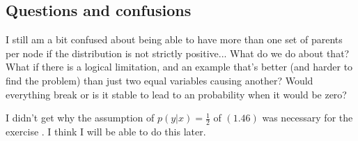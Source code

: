 \subsection{Questions and confusions}

I still am a bit confused about being able to have more than one set of parents per node if the distribution is not strictly positive... What do we do about that? What if there is a logical limitation, and an example that's better (and harder to find the problem) than just two equal variables causing another? Would everything break or is it stable to lead to an  probability when it would be zero?

I didn't get why the assumption of $p(y|x) = \frac{1}{2}$ of $(1.46)$ was necessary for the exercise . I think I will be able to do this later.
